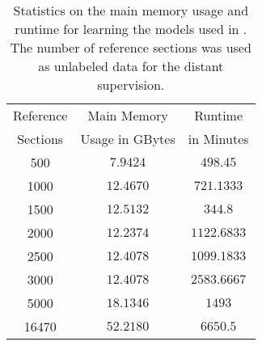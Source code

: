 \begin{table}[h]
\centering
\begin{tabular}{c c c}
 \toprule
 Reference & Main Memory  & Runtime \\
  Sections &  Usage in GBytes &  in Minutes\\
 \midrule
 \hphantom{00}\num{500} &  \hphantom{0}$7.9424$ &\hphantom{0}$498.45$\hphantom{00}   \\
 \hphantom{0}\num{1000}&  $12.4670$&\hphantom{0}$721.1333$ \\
 \hphantom{0}\num{1500} &  $12.5132$&\hphantom{0}$344.8$\hphantom{000}    \\
 \hphantom{0}\num{2000} &  $12.2374$&$1122.6833$\\
\hphantom{0}\num{2500} &  $12.4078$&$1099.1833$\\
\hphantom{0}\num{3000} &  $12.4078$&$2583.6667$\\
\hphantom{0}\num{5000} &  $18.1346$&$1493$\hphantom{.0000}     \\
\num{16470}&  $52.2180$&$6650.5$\hphantom{000}   \\
 \bottomrule
\end{tabular}
\caption{Statistics on the main memory usage and runtime for learning the models used in . The number of reference sections was used as unlabeled data for the distant supervision.}
\label{tab:ssoar-number-of-tags}
\end{table}


